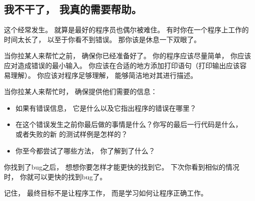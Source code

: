 \subsection{我不干了， 我真的需要帮助。}


这个经常发生。  
就算是最好的程序员也偶尔被难住。  
有时你在一个程序上工作的时间太长了， 以至于你看不到错误。  
那你该是休息一下双眼了。  


当你拉某人来帮忙之前， 确保你已经准备好了。  
你的程序应该尽量简单， 你应该应对造成错误的最小输入。  
你应该在合适的地方添加打印语句（打印输出应该容易理解）。  
你应该对程序足够理解， 能够简洁地对其进行描述。  


当你拉某人来帮忙时， 确保提供他们需要的信息：

\begin{itemize}


\item 如果有错误信息， 它是什么以及它指出程序的错误在哪里？

\item 在这个错误发生之前你最后做的事情是什么？你写的最后一行代码是什么， 或者失败的新
   的测试样例是怎样的？

\item 你至今都尝试了哪些方法， 你了解到了什么？

\end{itemize}


你找到了bug之后， 想想你要怎样才能更快的找到它。  
下次你看到相似的情况时， 你就可以更快的找到bug了。  

记住， 最终目标不是让程序工作， 而是学习如何让程序正确工作。  
